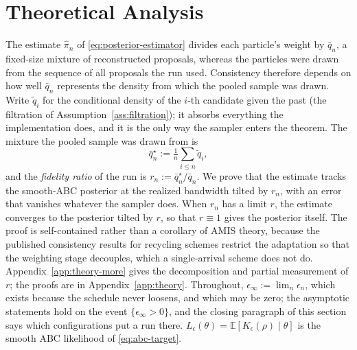 \documentclass[10pt]{article}
\theoremstyle{plain}
\theoremstyle{definition}
\begin{document}
\section{Theoretical Analysis}\label{sec:theory}
The estimate $\widehat\pi_n$ of \eqref{eq:posterior-estimator} divides each particle's weight by $\bar q_n$, a fixed-size mixture of reconstructed proposals, whereas the particles were drawn from the sequence of all proposals the run used. Consistency therefore depends on how well $\bar q_n$ represents the density from which the pooled sample was drawn. Write $\tilde q_i$ for the conditional density of the $i$-th candidate given the past (the filtration of Assumption~\ref{ass:filtration}); it absorbs everything the implementation does, and it is the only way the sampler enters the theorem. The mixture the pooled sample was drawn from is
\begin{equation}
\bar q^\star_n:=\tfrac1n\textstyle\sum_{i\le n}\tilde q_i,
\label{eq:draw-mixture}
\end{equation}
and the \emph{fidelity ratio} of the run is $r_n:=\bar q^\star_n/\bar q_n$. We prove that the estimate tracks the smooth-ABC posterior at the realized bandwidth tilted by $r_n$, with an error that vanishes whatever the sampler does. When $r_n$ has a limit $r$, the estimate converges to the posterior tilted by $r$, so that $r\equiv1$ gives the posterior itself. The proof is self-contained rather than a corollary of AMIS theory, because the published consistency results for recycling schemes \citep{marin2019consistency} restrict the adaptation so that the weighting stage decouples, which a single-arrival scheme does not do. Appendix~\ref{app:theory-more} gives the decomposition and partial measurement of $r$; the proofs are in Appendix~\ref{app:theory}. Throughout, $\epsilon_\infty:=\lim_n\epsilon_n$, which exists because the schedule never loosens, and which may be zero; the asymptotic statements hold on the event $\{\epsilon_\infty>0\}$, and the closing paragraph of this section says which configurations put a run there. $L_\epsilon(\theta)=\mathbb{E}[K_\epsilon(\rho)\mid\theta]$ is the smooth ABC likelihood of \eqref{eq:abc-target}.
\end{document}

